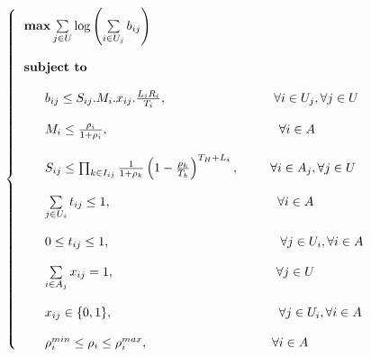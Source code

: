 \documentclass[journal,transmag]{IEEEtran}
\begin{document}
\begin{footnotesize}
\begin{equation}
\left\{
\begin{tabular}{l} 
$\textbf{max}  \sum\limits_{j \in U} \log \left(\sum\limits_{i \in U_j} b_{ij}\right) $ \\         
\\
\textbf{subject to} \\

\\
~~~~~$ b_{ij} \leq S_{ij} . M_i . x_{ij} . \frac{L_i R_i}{T_i}, $ ~~~~~~~~~~~~~~~~~~~~~~~~~$\forall i \in U_j, \forall j \in U $  \\


\\
~~~~~$M_i \leq  \frac{\rho_i}{1+\rho_i},  $~~~~~~~~~~~~~~~~~~~~~~~~~~~~~~~~~~~~~~~~ $ \forall i \in A $  \\

\\
~~~~~$ S_{ij} \leq \prod_{k \in I_{ij}} \frac{1}{1+ \rho_k} \left(1-\frac{\rho_k}{T_k} \right)^{T_H+L_i}, $~~~~~~~ $ \forall i \in A_j, \forall j \in U $  \\

\\
~~~~~$\sum\limits_{j \in U_i} t_{ij} \leq 1, $~~~~~~~~~~~~~~~~~~~~~~~~~~~~~~~~~~~~~~~ $ \forall i \in A $  \\

\\
~~~~~$0 \leq t_{ij} \leq 1, $~~~~~~~~~~~~~~~~~~~~~~~~~~~~~~~~~~~~~~~~ $\forall j \in U_i, \forall i \in A $  \\

\\
~~~~~$ \sum\limits_{i \in A_j} x_{ij} = 1, $ ~~~~~~~~~~~~~~~~~~~~~~~~~~~~~~~~~~~~~ $\forall j \in U $  \\

\\
~~~~~$ x_{ij} \in \{0,1 \}, $ ~~~~~~~~~~~~~~~~~~~~~~~~~~~~~~~~~~~~~~ $\forall j \in U_i,  \forall i \in A $  \\

\\
~~~~~$\rho_i^{min} \leq \rho_i \leq \rho_i^{max}, $~~~~~~~~~~~~~~~~~~~~~~~~~~~~~ $\forall i \in A $  \\



\end{tabular}
\right.
\end{equation}
\end{footnotesize}
\end{document}

